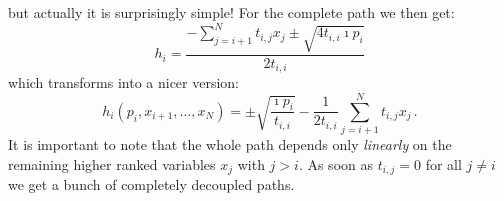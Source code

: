 \documentclass[a4paper,10pt]{article}
\begin{document}
but actually it is surprisingly simple!
For the complete path we then get:
\begin{equation}
  h_i = \frac{-\sum_{j=i+1}^{N} t_{i,j} x_j \pm \sqrt{4 t_{i,i} \imath p_i}}
             {2 t_{i,i}}
\end{equation}
which transforms into a nicer version:
\begin{equation}\label{eq:general_path_formula}
\boxed{
  h_i\left(p_i, x_{i+1}, \ldots, x_N\right)
  =
  \pm \sqrt{\frac{\imath p_i}{t_{i,i}}}
  -\frac{1}{2 t_{i,i}} \sum_{j=i+1}^{N} t_{i,j} x_j
  \,.
}
\end{equation}
It is important to note that the whole path depends only \emph{linearly}
on the remaining higher ranked variables $x_j$ with $j>i$.
As soon as $t_{i,j} = 0$ for all $j \neq i$ we get a bunch of
completely decoupled paths.
\end{document}

